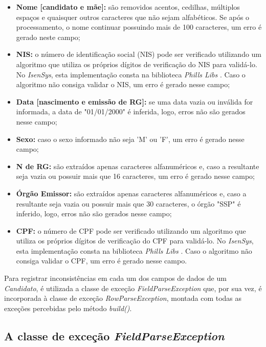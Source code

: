 \documentclass[
	12pt,			%
	openright,		%
	oneside,	
	a4paper,		%
	english,		%
	brazil			%
]{abntex2/abntex2}  %
\begin{document}
				\begin{itemize}
					
					\item \textbf{Nome [candidato e mãe]:} são removidos acentos, cedilhas, múltiplos espaços e quaisquer outros caracteres que não sejam alfabéticos. Se após o processamento, o nome continuar possuindo mais de 100 caracteres, um erro é gerado neste campo;
					\item \textbf{NIS:} o número de identificação social (NIS) pode ser verificado utilizando um algoritmo que utiliza os próprios dígitos de verificação do NIS para validá-lo. No \textit{IsenSys}, esta implementação consta na biblioteca \textit{Phills Libs} \cite{phills-libs}. Caso o algoritmo não consiga validar o NIS, um erro é gerado nesse campo;
					\item \textbf{Data [nascimento e emissão de RG]:} se uma data vazia ou inválida for informada, a data de "01/01/2000" é inferida, logo, erros não são gerados nesse campo;
					\item \textbf{Sexo:} caso o sexo informado não seja 'M' ou 'F', um erro é gerado nesse campo;
					\item \textbf{N{\textordmasculine} de RG:} são extraídos apenas caracteres alfanuméricos e, caso a resultante seja vazia ou possuir mais que 16 caracteres, um erro é gerado nesse campo;
					\item \textbf{Órgão Emissor:} são extraídos apenas caracteres alfanuméricos e, caso a resultante seja vazia ou possuir mais que 30 caracteres, o órgão "SSP" é inferido, logo, erros não são gerados nesse campo;
					\item \textbf{CPF:} o número de CPF pode ser verificado utilizando um algoritmo que utiliza os próprios dígitos de verificação do CPF para validá-lo. No \textit{IsenSys}, esta implementação consta na biblioteca \textit{Phills Libs} \cite{phills-libs}. Caso o algoritmo não consiga validar o CPF, um erro é gerado nesse campo.
					
				\end{itemize}
				
				Para registrar inconsistências em cada um dos campos de dados de um \textit{Candidato}, é utilizada a classe de exceção \textit{FieldParseException} que, por sua vez, é incorporada à classe de exceção \textit{RowParseException}, montada com todas as exceções percebidas pelo método \textit{build()}.

			\subsection{A classe de exceção \textit{FieldParseException}}
	
\end{document}
